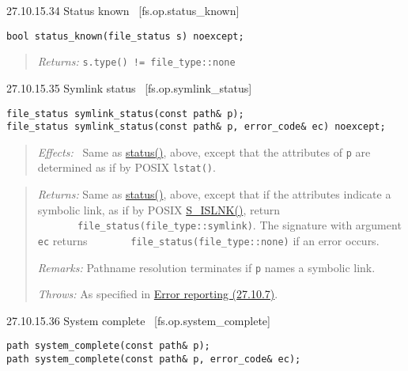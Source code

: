 27.10.15.34 Status known~ {[}fs.op.status\_known{]}

\begin{verbatim}
bool status_known(file_status s) noexcept;
\end{verbatim}

\begin{quote}
\emph{Returns:} \texttt{s.type()\ !=\ file\_type::none}
\end{quote}

27.10.15.35 Symlink status~ {[}fs.op.symlink\_status{]}

\begin{verbatim}
file_status symlink_status(const path& p);
file_status symlink_status(const path& p, error_code& ec) noexcept;
\end{verbatim}

\begin{quote}
\emph{Effects:}~ Same as \hyperref[status]{status()}, above, except that
the attributes of \texttt{p} are determined as if by POSIX
\texttt{lstat()}.
\end{quote}

\begin{quote}
\emph{Returns:} Same as \hyperref[status]{status()}, above, except that
if the attributes indicate a symbolic link, as if by POSIX
\href{http://www.opengroup.org/onlinepubs/000095399/basedefs/sys/stat.h.html}{S\_ISLNK()},
return \texttt{\ \ \ \ \ \ \ file\_status(file\_type::symlink)}. The
signature with argument \texttt{ec} returns
\texttt{\ \ \ \ \ \ \ file\_status(file\_type::none)} if an error
occurs.

\emph{Remarks:} Pathname resolution terminates if \texttt{p} names a
symbolic link.

\emph{Throws:} As specified in \hyperref[Error-reporting]{Error
reporting (27.10.7)}.
\end{quote}

27.10.15.36 System complete~ {[}fs.op.system\_complete{]}

\begin{verbatim}
path system_complete(const path& p);
path system_complete(const path& p, error_code& ec);
\end{verbatim}


